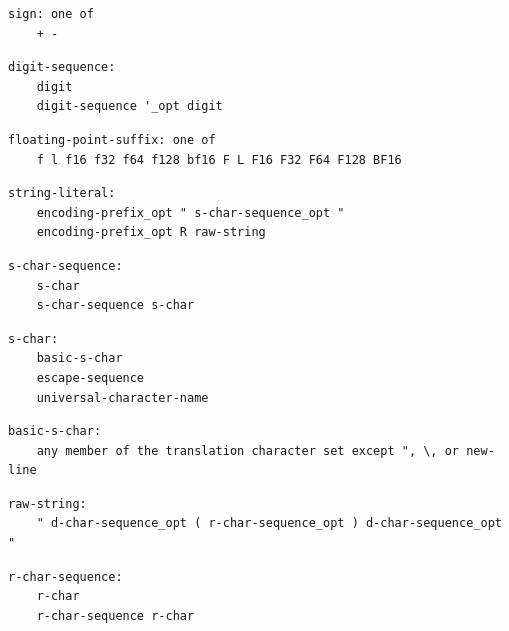 \noindent\textbf{\texttt{}}\par
\begin{lstlisting}
sign: one of
    + -
\end{lstlisting}

\noindent\textbf{\texttt{}}\par
\begin{lstlisting}
digit-sequence:
    digit
    digit-sequence '_opt digit
\end{lstlisting}

\noindent\textbf{\texttt{}}\par
\begin{lstlisting}
floating-point-suffix: one of
    f l f16 f32 f64 f128 bf16 F L F16 F32 F64 F128 BF16
\end{lstlisting}

\noindent\textbf{\texttt{}}\par
\begin{lstlisting}
string-literal:
    encoding-prefix_opt " s-char-sequence_opt "
    encoding-prefix_opt R raw-string
\end{lstlisting}

\noindent\textbf{\texttt{}}\par
\begin{lstlisting}
s-char-sequence:
    s-char
    s-char-sequence s-char
\end{lstlisting}

\noindent\textbf{\texttt{}}\par
\begin{lstlisting}
s-char:
    basic-s-char
    escape-sequence
    universal-character-name
\end{lstlisting}

\noindent\textbf{\texttt{}}\par
\begin{lstlisting}
basic-s-char:
    any member of the translation character set except ", \, or new-line
\end{lstlisting}

\noindent\textbf{\texttt{}}\par
\begin{lstlisting}
raw-string:
    " d-char-sequence_opt ( r-char-sequence_opt ) d-char-sequence_opt "
\end{lstlisting}

\noindent\textbf{\texttt{}}\par
\begin{lstlisting}
r-char-sequence:
    r-char
    r-char-sequence r-char
\end{lstlisting}

